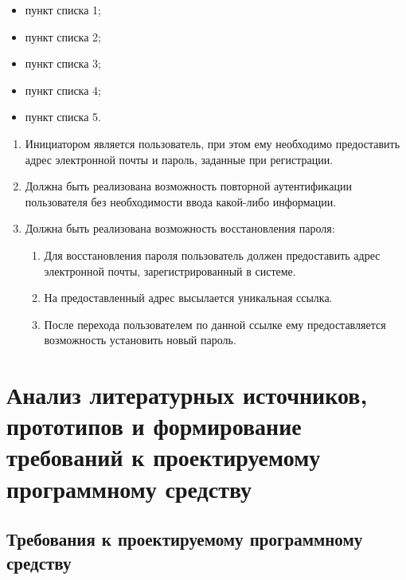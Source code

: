 \begin{itemize}
    \item пункт списка 1;
    \item пункт списка 2;
    \item пункт списка 3;
    \item пункт списка 4;
    \item пункт списка 5.
\end{itemize}


\begin{enumerate}
    \item Инициатором является пользователь, при этом ему необходимо предоставить адрес электронной почты и пароль, заданные при регистрации.
    \item Должна быть реализована возможность повторной аутентификации пользователя без необходимости ввода какой-либо информации.
    \item Должна быть реализована возможность восстановления пароля:
    \begin{enumerate}
        \item Для восстановления пароля пользователь должен предоставить адрес электронной почты, зарегистрированный в системе.
        \item На предоставленный адрес высылается уникальная ссылка.
        \item После перехода пользователем по данной ссылке ему предоставляется возможность установить новый пароль.
    \end{enumerate}
\end{enumerate}


\label{sec:definitions}


\section{Анализ литературных источников, прототипов и формирование требований к проектируемому программному средству}
\label{sec:analysis}


\subsection{Требования к проектируемому программному средству}
\label{sec:analysis:specification}


